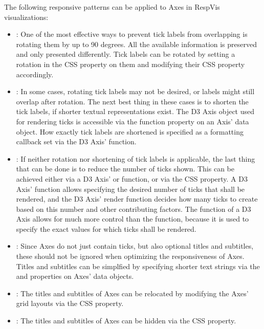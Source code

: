 The following responsive patterns can be applied to Axes in RespVis
visualizations:
\begin{itemize}
\item {}: One of the most effective ways to
  prevent tick labels from overlapping is rotating them by up to 90
  degrees. All the available information is preserved and only
  presented differently. Tick labels can be rotated by setting a
  rotation in the CSS  property on them and modifying
  their CSS  property accordingly.

\item {}: In some cases, rotating tick
  labels may not be desired, or labels might still overlap after
  rotation. The next best thing in these cases is to shorten the tick
  labels, if shorter textual representations exist. The D3 Axis
  object used for rendering ticks is accessible via the
   function property on an Axis' data object. How
  exactly tick labels are shortened is specified as a formatting
  callback set via the D3 Axis'  function.

\item {}: If neither rotation nor shortening of
  tick labels is applicable, the last thing that can be done is to
  reduce the number of ticks shown. This can be achieved either via a
  D3 Axis'  or  function, or via the CSS
   property. A D3 Axis'  function allows
  specifying the desired number of ticks that shall be rendered, and
  the D3 Axis' render function decides how many ticks to create based
  on this number and other contributing factors. The 
  function of a D3 Axis allows for much more control than the
   function, because it is used to specify the exact
  values for which ticks shall be rendered.

\item {}: Since Axes do not just
  contain ticks, but also optional titles and subtitles, these should
  not be ignored when optimizing the responsiveness of Axes. Titles
  and subtitles can be simplfied by specifying shorter text strings
  via the  and  properties on Axes' data
  objects.

\item {}: The titles and subtitles of
  Axes can be relocated by modifying the Axes' grid layouts via the
  CSS  property.

\item {}: The titles and subtitles of
  Axes can be hidden via the CSS  property.
\end{itemize}





